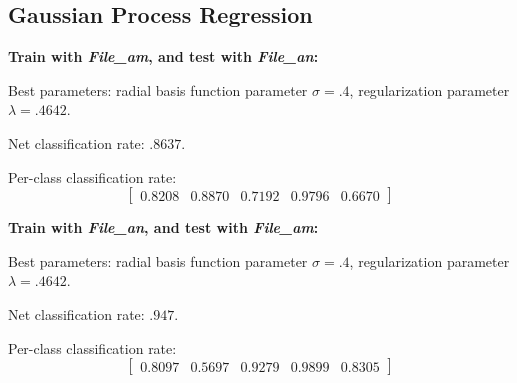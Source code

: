 \documentclass[letterpaper]{article}
\begin{document}
\subsection*{Gaussian Process Regression}

\textbf{Train with \textit{File\_am}, and test with \textit{File\_an}:}

Best parameters: radial basis function parameter $\sigma=.4$,
regularization parameter $\lambda=.4642$.

Net classification rate: .$8637$.

Per-class classification rate: 
$$\begin{bmatrix}0.8208   & 0.8870  &  0.7192   & 0.9796 &   0.6670\end{bmatrix}$$

\textbf{Train with \textit{File\_an}, and test with \textit{File\_am}:}

Best parameters: radial basis function parameter $\sigma=.4$, regularization parameter $\lambda=.4642$.

Net classification rate: $.947$.

Per-class classification rate: 
$$\begin{bmatrix}0.8097  &  0.5697   & 0.9279   & 0.9899  &  0.8305\end{bmatrix}$$
\end{document}
